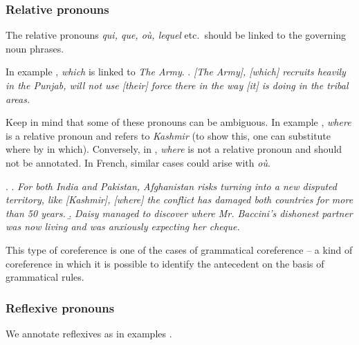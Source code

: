 \documentclass[a4paper]{article}
\begin{document}
{{\subsubsection{Relative pronouns}

The relative pronouns \textsl{qui, que, où, lequel} etc.\ should be linked to the
governing noun phrases.

In example \Next, {\sl which} is linked to \textsl{\sl The Army}.
\ex.
\textsl{[The Army], [which] recruits heavily in the Punjab, will not use [their] force there in the way [it] is doing in the tribal areas.}

Keep in mind that some of these pronouns can be ambiguous. In example \Next[a],
{\sl where} is a relative pronoun and refers to {\sl Kashmir} (to show this, one
can substitute where by in which). Conversely, in \Next[b], {\sl where} is not a
relative pronoun and should not be annotated. In French, similar cases could
arise with \textsl{où}.

\ex.
\a. {\sl For both India and Pakistan, Afghanistan risks turning into a new disputed
territory, like [Kashmir], [where] the conflict has damaged both countries for more than 50 years.}
\b. {\sl Daisy managed to discover where Mr. Baccini’s dishonest partner was now living and was anxiously expecting her cheque.}

This type of coreference is one of the cases of grammatical coreference --  a
kind of coreference in which it is possible to identify the antecedent on the
basis of grammatical rules.

\subsubsection{Reflexive pronouns}
We annotate reflexives as in examples \Next.

}}
\end{document}
